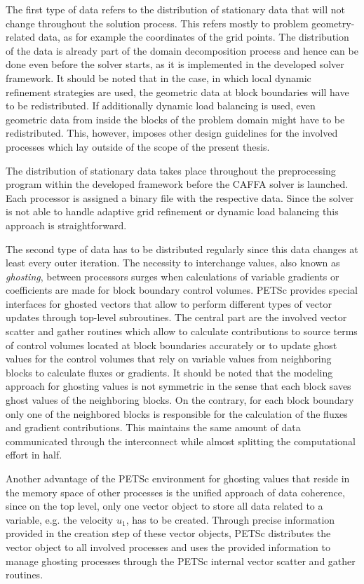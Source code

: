 The first type of data refers to the distribution of stationary data that will not change throughout the solution process. This refers mostly to problem geometry-related data, as for example the coordinates of the grid points. The distribution of the data is already part of the domain decomposition process and hence can be done even before the solver starts, as it is implemented in the developed solver framework. It should be noted that in the case, in which local dynamic refinement strategies are used, the geometric data at block boundaries will have to be redistributed. If additionally dynamic load balancing is used, even geometric data from inside the blocks of the problem domain might have to be redistributed. This, however, imposes other design guidelines for the involved processes which lay outside of the scope of the present thesis.

The distribution of stationary data takes place throughout the preprocessing program within the developed framework before the CAFFA solver is launched. Each processor is assigned a binary file with the respective data. Since the solver is not able to handle adaptive grid refinement or dynamic load balancing this approach is straightforward.

The second type of data has to be distributed regularly since this data changes at least every outer iteration. The necessity to interchange values, also known as \emph{ghosting}, between processors surges when calculations of variable gradients or coefficients are made for block boundary control volumes. PETSc provides special interfaces for ghosted vectors that allow to perform different types of vector updates through top-level subroutines. The central part are the involved vector scatter and gather routines which allow to calculate contributions to source terms of control volumes located at block boundaries accurately or to update ghost values for the control volumes that rely on variable values from neighboring blocks to calculate fluxes or gradients. It should be noted that the modeling approach for ghosting values is not symmetric in the sense that each block saves ghost values of the neighboring blocks. On the contrary, for each block boundary only one of the neighbored blocks is responsible for the calculation of the fluxes and gradient contributions. This maintains the same amount of data communicated through the interconnect while almost splitting the computational effort in half.

Another advantage of the PETSc environment for ghosting values that reside in the memory space of other processes is the unified approach of data coherence, since on the top level, only one vector object to store all data related to a variable, e.g. the velocity \(u_1\), has to be created. Through precise information provided in the creation step of these vector objects, PETSc distributes the vector object to all involved processes and uses the provided information to manage ghosting processes through the PETSc internal vector scatter and gather routines. 

